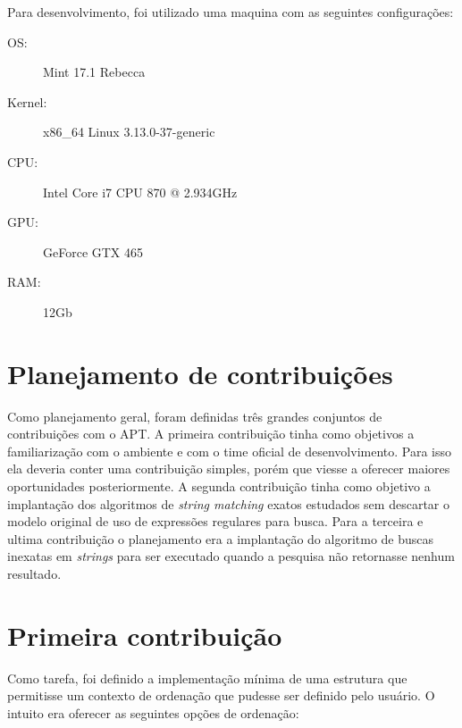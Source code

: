 Para desenvolvimento, foi utilizado uma maquina com as seguintes configurações:


\begin{description}
	\item[OS:] Mint 17.1 Rebecca
	\item[Kernel:] x86\_64 Linux 3.13.0-37-generic
	\item[CPU:] Intel Core i7 CPU 870 @ 2.934GHz
	\item[GPU:] GeForce GTX 465
	\item[RAM:] 12Gb
\end{description}


\section{Planejamento de contribuições} %
\label{sec:planejamento_de_contribui_es}

Como planejamento geral, foram definidas três grandes conjuntos de contribuições com o {\code APT}. A primeira contribuição tinha como objetivos a familiarização com o ambiente e com o time oficial de desenvolvimento. Para isso ela deveria conter uma contribuição simples, porém que viesse a oferecer maiores oportunidades posteriormente. A segunda contribuição tinha como objetivo a implantação dos algoritmos de \textit{string matching} exatos estudados sem descartar o modelo original de uso de expressões regulares para busca. Para a terceira e ultima contribuição o planejamento era a implantação do algoritmo de buscas inexatas em \textit{strings} para ser executado quando a pesquisa não retornasse nenhum resultado.


\section{Primeira contribuição} %
\label{sec:primeira_contribui_o}

Como tarefa, foi definido a implementação mínima de uma estrutura que permitisse um contexto de ordenação que pudesse ser definido pelo usuário. O intuito era oferecer as seguintes opções de ordenação:

